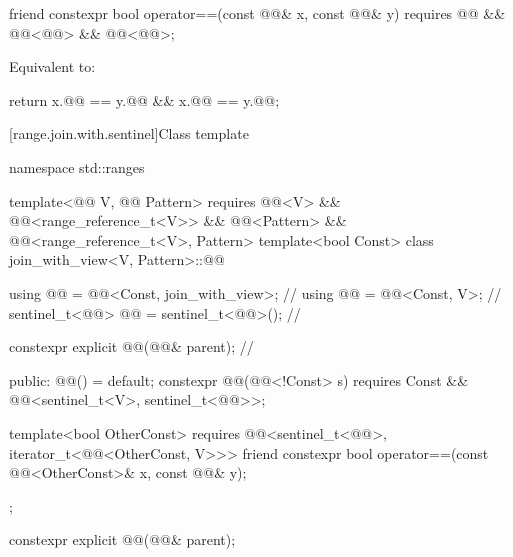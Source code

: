 \begin{itemdecl}
friend constexpr bool operator==(const @@& x, const @@& y)
  requires @@ && @@<@@> &&
           @@<@@>;
\end{itemdecl}

\begin{itemdescr}
\pnum
\effects
Equivalent to:
\begin{codeblock}
return x.@@ == y.@@ && x.@@ == y.@@;
\end{codeblock}
\end{itemdescr}

[range.join.with.sentinel]{Class template }

\begin{codeblock}
namespace std::ranges {
  template<@@ V, @@ Pattern>
    requires @@<V> && @@<range_reference_t<V>>
          && @@<Pattern> && @@<range_reference_t<V>, Pattern>
  template<bool Const>
  class join_with_view<V, Pattern>::@@ {
    using @@ = @@<Const, join_with_view>;  // \expos
    using @@ = @@<Const, V>;                 // \expos
    sentinel_t<@@> @@ = sentinel_t<@@>();         // \expos

    constexpr explicit @@(@@& parent);        // \expos

  public:
    @@() = default;
    constexpr @@(@@<!Const> s)
      requires Const && @@<sentinel_t<V>, sentinel_t<@@>>;

    template<bool OtherConst>
      requires @@<sentinel_t<@@>, iterator_t<@@<OtherConst, V>>>
    friend constexpr bool operator==(const @@<OtherConst>& x, const @@& y);
  };
}
\end{codeblock}

\begin{itemdecl}
constexpr explicit @@(@@& parent);
\end{itemdecl}

